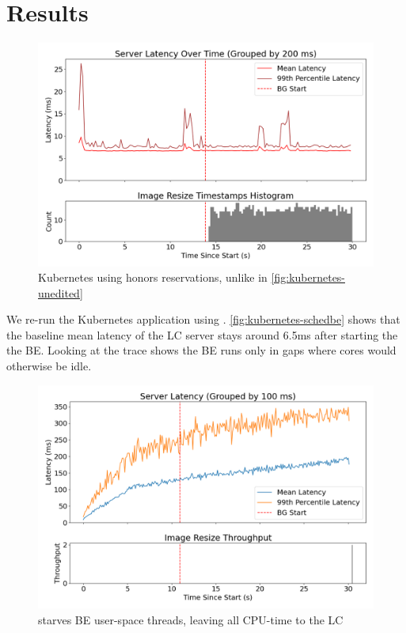 \section{Results}

\begin{figure}[t]
    \centering
    \includegraphics[width=\columnwidth]{graphs/kubernetes-schedbe.png}
    \caption{ Kubernetes using \beclass{} honors reservations, unlike in
    \autoref{fig:kubernetes-unedited} }\label{fig:kubernetes-schedbe}
\end{figure}

We re-run the Kubernetes application using \beclass{}.
\autoref{fig:kubernetes-schedbe} shows that the baseline mean latency of the LC
server stays around 6.5ms after starting the the BE. Looking at the trace shows
the BE runs only in gaps where cores would otherwise be idle.

\begin{figure}[t]
    \centering
    \includegraphics[width=\columnwidth]{graphs/overload-schedbe.png}
    \caption{ \beclass{} starves BE user-space threads, leaving all CPU-time to
    the LC}\label{fig:overload-schedbe}
\end{figure}

